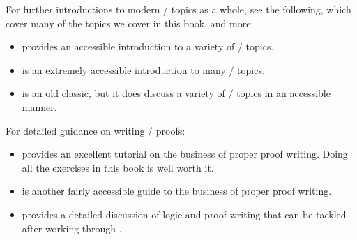 \documentclass[../../../main.tex]{subfiles}
\begin{document}
\noindent
For further introductions to modern \mathical/ topics as a whole, see the following, which cover many of the topics we cover in this book, and more:

\begin{itemize}

  \item \citet{Steinhart2018} provides an accessible introduction to a variety of \mathical/ topics.

  \item \citet{BurgerAndStarbird2010} is an extremely accessible introduction to many \mathical/ topics.
  
  \item \citet{Stewart1995} is an old classic, but it does discuss a variety of \mathical/ topics in an accessible manner.

\end{itemize}

\noindent
For detailed guidance on writing \mathical/ proofs:

\begin{itemize}

  \item \citet{Velleman2019} provides an excellent tutorial on the business of proper proof writing. Doing all the exercises in this book is well worth it.
  
  \item \citet{Wolf1998} is another fairly accessible guide to the business of proper proof writing.

  \item \citet[chs.~7--8]{MaddenAndAubrey2017} provides a detailed discussion of logic and proof writing that can be tackled after working through \citet{Velleman2019}.

\end{itemize}
\end{document}
